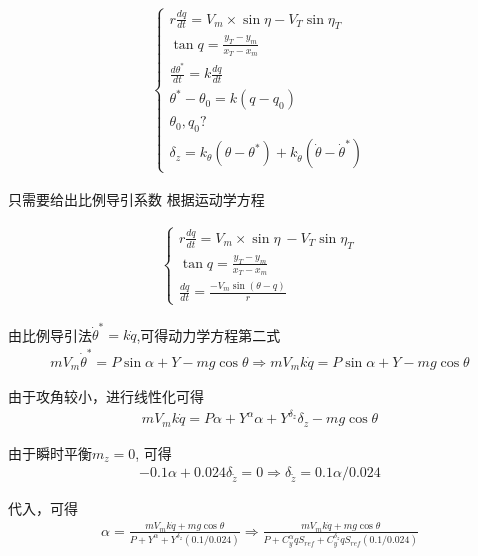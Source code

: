 \documentclass[UTF8]{ctexart}
\begin{document}



\begin{align}
    \begin{cases}
        r\frac{dq}{dt}=V_{m}\times\sin\eta-V_{T}\sin\eta_{T} \\
        \tan q=\frac{y_{T}-y_{m}}{x_{T}-x_{m}}               \\
        \frac{d\theta^*}{dt}=k\frac{dq}{dt}                  \\
        \theta^{*}-\theta_{0}=k(q-q_{0})                     \\
        \theta_{0},q_{0}?                                    \\
        \delta_{z}=k_{\theta}(\theta-\theta^{*})+k_{\dot{\theta}}(\dot{\theta}-\dot{\theta}^{*})
    \end{cases}
\end{align}


只需要给出比例导引系数
根据运动学方程

\begin{align}
    \begin{cases}
        r\frac{dq}{dt}=V_{m}\times\sin\eta\:-V_{T}\sin\eta_{T}  \\
        \tan q=\frac{y_T-y_m}{x_T-x_m}    \\
        \frac{dq}{dt} =\frac{-V_m\sin(\theta-q)}r
    \end{cases}
\end{align}

由比例导引法$\dot{\theta}^*=k\dot{q}$,可得动力学方程第二式
\begin{align}
    mV_m\dot{\theta}^*=P\sin\alpha+Y-mg\cos\theta\Rightarrow mV_mk\dot{q}=P\sin\alpha+Y-mg\cos\theta
\end{align}

由于攻角较小，进行线性化可得
\begin{align}
    mV_{m}k\dot{q}=P\alpha+Y^{\alpha}\alpha+Y^{\delta_{z}}\delta_{z}-mg\cos\theta
\end{align}

由于瞬时平衡$m_z=0$, 可得
\begin{align}
    -0.1\alpha+0.024\delta_{\tilde{z}}=0\Rightarrow\delta_{\tilde{z}}=0.1\alpha/0.024
\end{align}

代入，可得
\begin{align}
    \alpha=\frac{mV_{m}k\dot{q}+mg\cos\theta}{P+Y^{\alpha}+Y^{\delta_{z}}(0.1/0.024)}\Rightarrow\frac{mV_{m}k\dot{q}+mg\cos\theta}{P+C_{y}^{\alpha}qS_{ref}+C_{y}^{\delta_{z}}qS_{ref}(0.1/0.024)}
\end{align}
\end{document}
